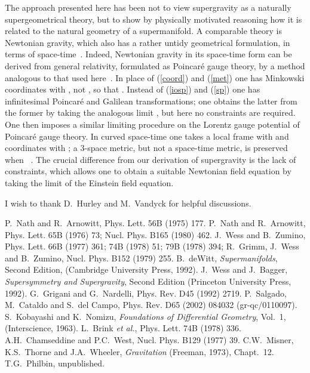 \documentclass[a4paper,12pt]{article}
\begin{document}
The approach presented here has been not to view supergravity as a naturally supergeometrical theory, but to show by physically motivated reasoning how  it is related to the natural geometry of a supermanifold. A comparable theory is Newtonian gravity, which also has a rather untidy geometrical formulation, in terms of space-time~\cite{mis}. Indeed, Newtonian gravity in its space-time form can be derived from general relativity, formulated as Poincar\'{e} gauge theory, by a method analogous to that used here~\cite{phi}. In place of (\ref{coord}) and (\ref{met}) one has Minkowski coordinates with \coordHE{}, not \coordHE{}, so that \coordHE{}. Instead of (\ref{iosp}) and (\ref{sp}) one has infinitesimal Poincar\'{e} and Galilean transformations; one obtains the latter from the former by taking the analogous limit \coordHE{}, but here no constraints are required. One then imposes a similar limiting procedure on the Lorentz gauge potential of Poincar\'{e} gauge theory. In curved space-time one takes a local frame with \coordHE{} and coordinates with \coordHE{}; a 3-space metric, but not a space-time metric, is preserved when \coordHE{}~\cite{mis}. The crucial difference from our derivation of supergravity is the lack of constraints, which allows one to obtain a suitable Newtonian field equation by taking the \coordHE{} limit of the Einstein field equation.
\vspace{5mm}

I wish to thank D.\ Hurley and M.\ Vandyck for helpful discussions.

\begin{thebibliography}{99}
 P.\ Nath and R.\ Arnowitt, Phys. Lett. 56B (1975) 177.
 P.\ Nath and R.\ Arnowitt, Phys. Lett. 65B (1976) 73; Nucl. Phys. B165 (1980) 462.
 J.\ Wess and B.\ Zumino, Phys. Lett. 66B (1977) 361; 74B (1978) 51; 79B (1978) 394; R.\ Grimm, J.\ Wess and B.\ Zumino, Nucl. Phys. B152 (1979) 255.
 B.\ deWitt, {\it Supermanifolds}, Second Edition, (Cambridge University Press, 1992). 
 J.\ Wess and J.\ Bagger, {\it Supersymmetry and Supergravity}, Second Edition (Princeton University Press, 1992).
 G.\ Grigani and G.\ Nardelli, Phys. Rev. D45 (1992) 2719. 
 P.\ Salgado, M.\ Cataldo and S.\ del Campo, Phys. Rev. D65 (2002) 084032 (gr-qc/0110097).
 S.\ Kobayashi and K.\ Nomizu, {\it Foundations of Differential Geometry}, Vol.\ 1, (Interscience, 1963).
 L.\ Brink {\it et al.}, Phys. Lett. 74B (1978) 336.
 A.H.\ Chamseddine and P.C.\ West, Nucl. Phys. B129 (1977) 39.
 C.W.\ Misner, K.S.\ Thorne and J.A.\ Wheeler, {\it Gravitation} (Freeman, 1973), Chapt.~12.
 T.G.\ Philbin, unpublished.
\end{thebibliography}
\end{document}
